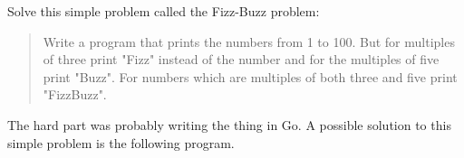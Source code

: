 \begin{Exercise}[title={FizzBuzz},difficulty=1]
\label{ex:fizzbuzz}
\Question \label{ex:fizzbuzz q1} Solve this simple problem called
the Fizz-Buzz \cite{fizzbuzz} problem:
\begin{quote}
Write a program that prints the numbers from 1 to 100. But for multiples
of three print "Fizz" instead of the number and for the multiples of
five print "Buzz". For numbers which are multiples of both three and
five print "FizzBuzz".
\end{quote}
\end{Exercise}

\begin{Answer}
\Question The hard part was probably writing the thing in Go. A possible
solution to this simple problem is the following program.

\end{Answer}
